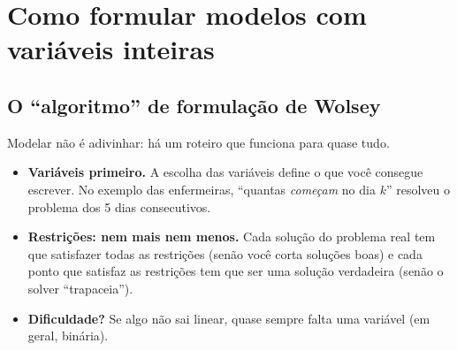 \chapter{Como formular modelos com variáveis inteiras}
\label{cap:formular}

\section{O ``algoritmo'' de formulação de Wolsey}

Modelar não é adivinhar: há um roteiro que funciona para quase tudo.

\begin{center}
\end{center}

\begin{itemize}
  \item \textbf{Variáveis primeiro.} A escolha das variáveis define o que você consegue escrever. No exemplo das
  enfermeiras, ``quantas \emph{começam} no dia $k$'' resolveu o problema dos 5 dias consecutivos.
  \item \textbf{Restrições: nem mais nem menos.} Cada solução do problema real tem que satisfazer todas as
  restrições (senão você corta soluções boas) e cada ponto que satisfaz as restrições tem que ser uma solução
  verdadeira (senão o solver ``trapaceia'').
  \item \textbf{Dificuldade?} Se algo não sai linear, quase sempre falta uma variável (em geral, binária).
\end{itemize}

